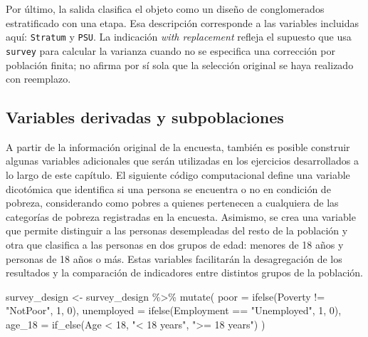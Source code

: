 \documentclass[
  spanish,
  11pt,
  letterpaper,
  oneside,
  open=any]{scrbook}
\newenvironment{Shaded}{\begin{snugshade}}{\end{snugshade}}
\newcommand{\AttributeTok}[1]{\textcolor[rgb]{0.40,0.45,0.13}{#1}}
\newcommand{\DecValTok}[1]{\textcolor[rgb]{0.68,0.00,0.00}{#1}}
\newcommand{\FunctionTok}[1]{\textcolor[rgb]{0.28,0.35,0.67}{#1}}
\newcommand{\NormalTok}[1]{\textcolor[rgb]{0.00,0.23,0.31}{#1}}
\newcommand{\OtherTok}[1]{\textcolor[rgb]{0.00,0.23,0.31}{#1}}
\newcommand{\SpecialCharTok}[1]{\textcolor[rgb]{0.37,0.37,0.37}{#1}}
\newcommand{\StringTok}[1]{\textcolor[rgb]{0.13,0.47,0.30}{#1}}
\begin{document}
Por último, la salida clasifica el objeto como un diseño de
conglomerados estratificado con una etapa. Esa descripción corresponde a
las variables incluidas aquí: \texttt{Stratum} y \texttt{PSU}. La
indicación \emph{with replacement} refleja el supuesto que usa
\texttt{survey} para calcular la varianza cuando no se especifica una
corrección por población finita; no afirma por sí sola que la selección
original se haya realizado con reemplazo.

\subsection{Variables derivadas y
subpoblaciones}\label{variables-dominios-categoricas}

A partir de la información original de la encuesta, también es posible
construir algunas variables adicionales que serán utilizadas en los
ejercicios desarrollados a lo largo de este capítulo. El siguiente
código computacional define una variable dicotómica que identifica si
una persona se encuentra o no en condición de pobreza, considerando como
pobres a quienes pertenecen a cualquiera de las categorías de pobreza
registradas en la encuesta. Asimismo, se crea una variable que permite
distinguir a las personas desempleadas del resto de la población y otra
que clasifica a las personas en dos grupos de edad: menores de 18 años y
personas de 18 años o más. Estas variables facilitarán la desagregación
de los resultados y la comparación de indicadores entre distintos grupos
de la población.

\begin{Shaded}
\begin{Highlighting}[]
\NormalTok{survey\_design }\OtherTok{\textless{}{-}}\NormalTok{ survey\_design }\SpecialCharTok{\%\textgreater{}\%}
  \FunctionTok{mutate}\NormalTok{(}
    \AttributeTok{poor =} \FunctionTok{ifelse}\NormalTok{(Poverty }\SpecialCharTok{!=} \StringTok{"NotPoor"}\NormalTok{, }\DecValTok{1}\NormalTok{, }\DecValTok{0}\NormalTok{),}
    \AttributeTok{unemployed =} \FunctionTok{ifelse}\NormalTok{(Employment }\SpecialCharTok{==} \StringTok{"Unemployed"}\NormalTok{, }\DecValTok{1}\NormalTok{, }\DecValTok{0}\NormalTok{),}
    \AttributeTok{age\_18 =} \FunctionTok{if\_else}\NormalTok{(Age }\SpecialCharTok{\textless{}} \DecValTok{18}\NormalTok{, }\StringTok{"\textless{} 18 years"}\NormalTok{, }\StringTok{"\textgreater{}= 18 years"}\NormalTok{)}
\NormalTok{  )}
\end{Highlighting}
\end{Shaded}
\end{document}
